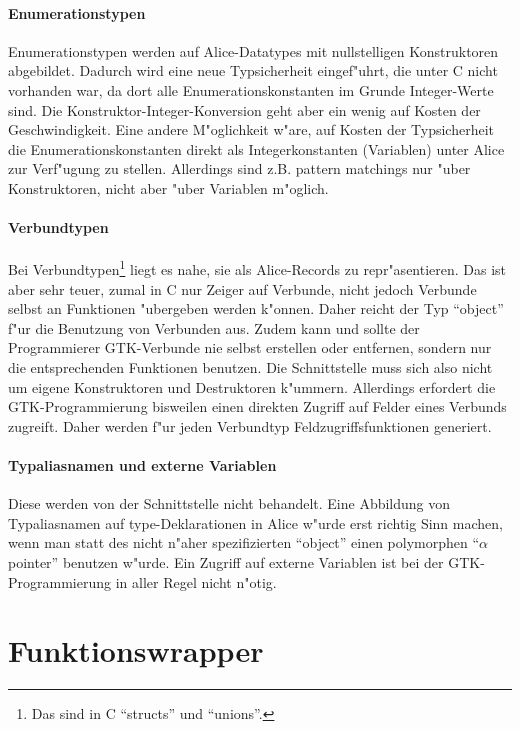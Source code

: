 \documentclass{article}
\begin{document}
\paragraph{Enumerationstypen}

Enumerationstypen werden auf Alice-Datatypes mit nullstelligen
Konstruktoren abgebildet. Dadurch wird eine neue Typsicherheit eingef"uhrt,
die unter C nicht vorhanden war, da dort alle Enumerationskonstanten im Grunde
Integer-Werte sind. Die Konstruktor-Integer-Konversion geht aber
ein wenig auf Kosten der Geschwindigkeit. 
Eine andere M"oglichkeit w"are, auf Kosten der Typsicherheit 
die Enumerationskonstanten direkt als Integerkonstanten (Variablen) unter Alice
zur Verf"ugung zu stellen. Allerdings sind z.B. pattern matchings nur "uber
Konstruktoren, nicht aber "uber Variablen m"oglich.

\paragraph{Verbundtypen}
Bei Verbundtypen\footnote{Das sind in C ``structs'' und ``unions''.} 
liegt es nahe,
sie als Alice-Records zu repr"asentieren. Das ist aber sehr teuer, zumal in C
nur Zeiger auf Verbunde, nicht jedoch Verbunde selbst
an Funktionen "ubergeben werden k"onnen.
Daher reicht der Typ ``object'' f"ur die Benutzung von Verbunden aus.
Zudem kann und sollte der Programmierer GTK-Verbunde nie selbst
erstellen oder entfernen, sondern nur die entsprechenden Funktionen benutzen.
Die Schnittstelle muss sich also nicht um eigene Konstruktoren und Destruktoren
k"ummern. Allerdings erfordert die GTK-Programmierung bisweilen einen direkten
Zugriff auf Felder eines Verbunds zugreift. Daher werden f"ur jeden
Verbundtyp Feldzugriffsfunktionen generiert.

\paragraph{Typaliasnamen und externe Variablen}
Diese werden von
der Schnittstelle nicht behandelt. Eine Abbildung von Typaliasnamen auf
type-Deklarationen in Alice w"urde erst richtig Sinn machen, wenn man
statt des nicht n"aher spezifizierten ``object'' einen polymorphen
``$\alpha$ pointer'' benutzen w"urde. Ein Zugriff auf externe Variablen
ist bei der GTK-Programmierung in aller Regel nicht n"otig.

\section{Funktionswrapper}
\end{document}
